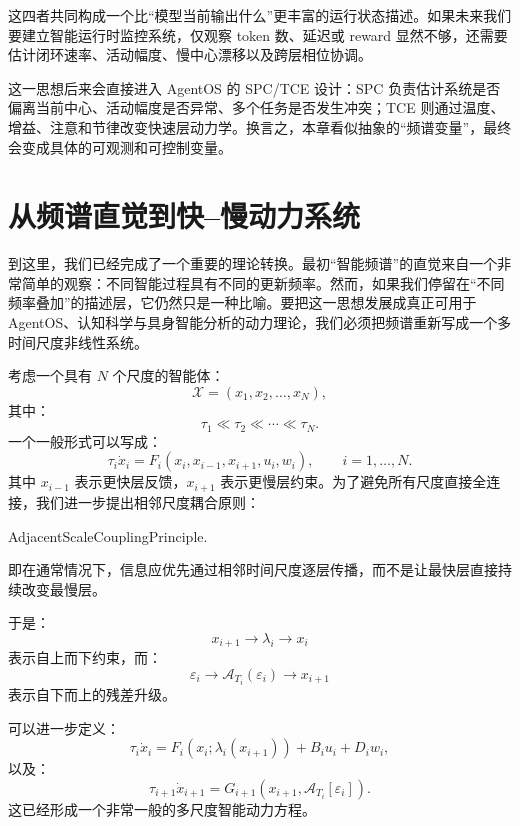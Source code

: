 \begin{statementbox}
\centering
{}
\end{statementbox}

\begin{statementbox}
\centering
{}
\end{statementbox}

这四者共同构成一个比“模型当前输出什么”更丰富的运行状态描述。如果未来我们要建立智能运行时监控系统，仅观察 token 数、延迟或 reward 显然不够，还需要估计闭环速率、活动幅度、慢中心漂移以及跨层相位协调。

这一思想后来会直接进入 AgentOS 的 SPC/TCE 设计：SPC 负责估计系统是否偏离当前中心、活动幅度是否异常、多个任务是否发生冲突；TCE 则通过温度、增益、注意和节律改变快速层动力学。换言之，本章看似抽象的“频谱变量”，最终会变成具体的可观测和可控制变量。

\section{从频谱直觉到快--慢动力系统}

到这里，我们已经完成了一个重要的理论转换。最初“智能频谱”的直觉来自一个非常简单的观察：不同智能过程具有不同的更新频率。然而，如果我们停留在“不同频率叠加”的描述层，它仍然只是一种比喻。要把这一思想发展成真正可用于 AgentOS、认知科学与具身智能分析的动力理论，我们必须把频谱重新写成一个多时间尺度非线性系统。

考虑一个具有 $N$ 个尺度的智能体：
\[
\mathcal{X}
=
(x_1,x_2,\ldots,x_N),
\]
其中：
\[
\tau_1
\ll
\tau_2
\ll
\cdots
\ll
\tau_N.
\]
一个一般形式可以写成：
\[
\tau_i
\dot{x}_i
=
F_i
\left(
x_i,
x_{i-1},
x_{i+1},
u_i,
w_i
\right),
\qquad
i=1,\ldots,N.
\]
其中 $x_{i-1}$ 表示更快层反馈，$x_{i+1}$ 表示更慢层约束。为了避免所有尺度直接全连接，我们进一步提出相邻尺度耦合原则：
\begin{statementbox}
AdjacentScaleCouplingPrinciple.
\end{statementbox}
即在通常情况下，信息应优先通过相邻时间尺度逐层传播，而不是让最快层直接持续改变最慢层。

于是：
\[
x_{i+1}
\rightarrow
\lambda_i
\rightarrow
x_i
\]
表示自上而下约束，而：
\[
\varepsilon_i
\rightarrow
\mathcal{A}_{T_i}(\varepsilon_i)
\rightarrow
x_{i+1}
\]
表示自下而上的残差升级。

可以进一步定义：
\[
\tau_i\dot{x}_i
=
F_i
\left(
x_i;
\lambda_i(x_{i+1})
\right)
+
B_i u_i
+
D_i w_i,
\]
以及：
\[
\tau_{i+1}
\dot{x}_{i+1}
=
G_{i+1}
\left(
x_{i+1},
\mathcal{A}_{T_i}[\varepsilon_i]
\right).
\]
这已经形成一个非常一般的多尺度智能动力方程。

